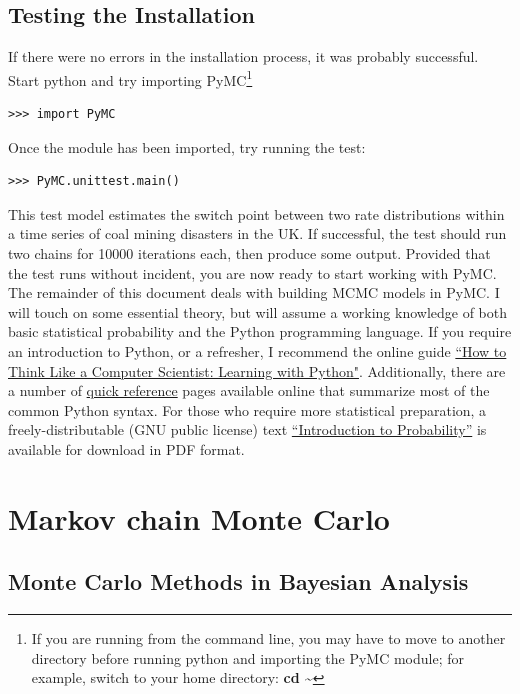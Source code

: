 \documentclass[]{book}
\begin{document}
\section{Testing the Installation}

If there were no errors in the installation process, it was probably successful. Start python and try importing PyMC\footnote{If you are running from the command line, you may have to move to another directory before running python and importing the PyMC module; for example, switch to your home directory: \textbf{cd \textasciitilde}}
\begin{verbatim}
>>> import PyMC
\end{verbatim}
Once the module has been imported, try running the test:
\begin{verbatim}
>>> PyMC.unittest.main()
\end{verbatim}

This test model estimates the switch point between two rate distributions within a time series of coal mining disasters in the UK. If successful, the test should run two chains for 10000 iterations each, then produce some output. Provided that the test runs without incident, you are now ready to start working with PyMC. The remainder of this document deals with building MCMC models in PyMC. I will touch on some essential theory, but will assume a working knowledge of both basic statistical probability and the Python programming language. If you require an introduction to Python, or a refresher, I recommend the online guide \href{http://www.ibiblio.org/obp/thinkCSpy/index.htm}{``How to Think Like a Computer Scientist: Learning with Python"}. Additionally, there are a number of \href{http://rgruet.free.fr/PQR24/PQR2.4.html}{quick reference} pages available online that summarize most of the common Python syntax. For those who require more statistical preparation, a freely-distributable (GNU public license) text \href{https://www.dartmouth.edu/~chance/teaching_aids/books_articles/probability_book/amsbook.mac.pdf}{``Introduction to Probability''} is available for download in PDF format.

\chapter{Markov chain Monte Carlo}


\section{Monte Carlo Methods in Bayesian Analysis}
\end{document}
